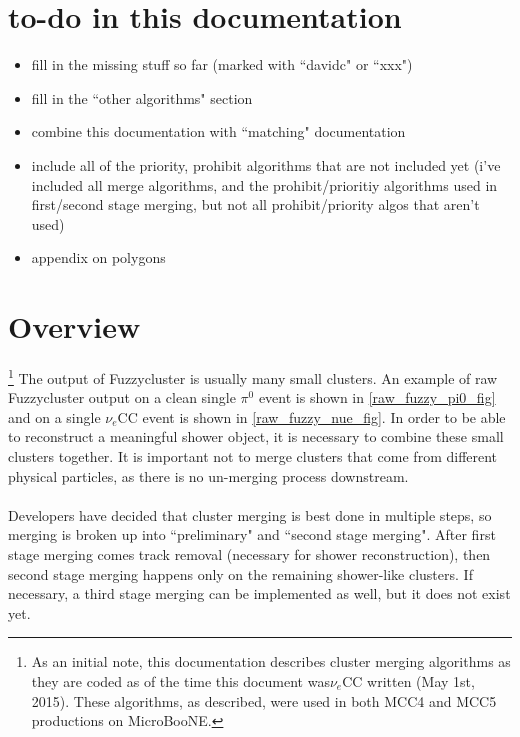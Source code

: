 \documentclass{article}
\title{\myTitle}
\author{\myAuthorName}
\date{\today}
\begin{document}
\maketitle

\newpage

\tableofcontents

\newpage


\section{to-do in this documentation}
\begin{itemize}
\item fill in the missing stuff so far (marked with ``davidc" or ``xxx")
\item fill in the ``other algorithms" section
\item combine this documentation with ``matching" documentation
\item include all of the priority, prohibit algorithms that are not included yet (i've included all merge algorithms, and the prohibit/prioritiy algorithms used in first/second stage merging, but not all prohibit/priority algos that aren't used)
\item appendix on polygons
\end{itemize}

\section{Overview}
\footnote{As an initial note, this documentation describes cluster merging algorithms as they are coded as of the time this document was$\nu_e$CC written (May 1st, 2015). These algorithms, as described, were used in both MCC4 and MCC5 productions on MicroBooNE.} The output of Fuzzycluster is usually many small clusters. An example of raw Fuzzycluster output on a clean single $\pi^0$ event is shown in \autoref{raw_fuzzy_pi0_fig} and on a single $\nu_e$CC event is shown in \autoref{raw_fuzzy_nue_fig}. In order to be able to reconstruct a meaningful shower object, it is necessary to combine these small clusters together. It is important not to merge clusters that come from different physical particles, as there is no un-merging process downstream. \\\\
\indent Developers have decided that cluster merging is best done in multiple steps, so merging is broken up into ``preliminary" and ``second stage merging". After first stage merging comes track removal (necessary for shower reconstruction), then second stage merging happens only on the remaining shower-like clusters. If necessary, a third stage merging can be implemented as well, but it does not exist yet.
\end{document}
